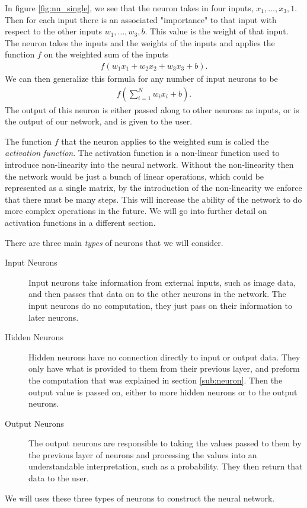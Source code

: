 \documentclass[10pt]{amsart}
\begin{document}
\begin{multicols}{2}
  In figure \ref{fig:nn_single}, we see that the neuron takes in four inputs,
  $x_1,\ldots,x_3,1$. Then for each input there is an associated "importance"
  to that input with respect to the other inputs $w_1,\ldots,w_3,b$. This value
  is the weight of that input. The neuron takes the inputs and the weights of
  the inputs and applies the function $f$ on the weighted sum of the inputs
  \begin{align*}
    f(w_1x_1+w_2x_2+w_3x_3+b).
  \end{align*}
  We can then generalize this formula for any number of input neurons to be
  \begin{align}\label{eq:nn_neuron}
    f\left(\sum_{i=1}^Nw_ix_i+b\right).
  \end{align}
  The output of this neuron is either passed along to other neurons as inputs,
  or is the output of our network, and is given to the user.

  The function $f$ that the neuron applies to the weighted sum is called the
  \textit{activation function}. The activation function is a non-linear
  function used to introduce non-linearity into the neural network. Without the
  non-linearity then the network would be just a bunch of linear operations,
  which could be represented as a single matrix, by the introduction of the
  non-linearity we enforce that there must be many steps. This will increase
  the ability of the network to do more complex operations in the future. We
  will go into further detail on activation functions in a different section.

  There are three main \textit{types} of neurons that we will consider.
  \begin{description}
    \item[Input Neurons] Input neurons take information from external inputs,
      such as image data, and then passes that data on to the other neurons in
      the network. The input neurons do no computation, they just pass on their
      information to later neurons.
    \item[Hidden Neurons] Hidden neurons have no connection directly to input
      or output data. They only have what is provided to them from their
      previous layer, and preform the computation that was explained in section
      \ref{sub:neuron}. Then the output value is passed on, either to more
      hidden neurons or to the output neurons.
    \item[Output Neurons] The output neurons are responsible to taking the
      values passed to them by the previous layer of neurons and processing the
      values into an understandable interpretation, such as a probability. They
      then return that data to the user.
  \end{description}
  We will uses these three types of neurons to construct the neural network.


\end{multicols}
\end{document}
